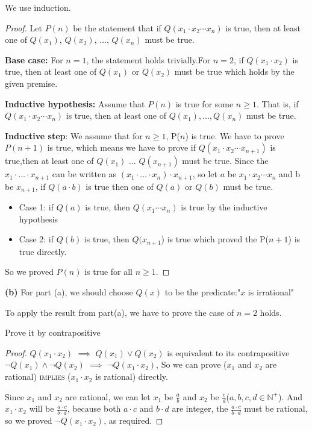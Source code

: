 \documentclass[12pt]{article}
\begin{document}
We use induction.

\begin{proof}
    Let $P(n)$ be the statement that if $Q(x_1 \cdot x_2 \cdots x_n)$ is true, then at least one of $Q(x_1)$, $Q(x_2)$, $\dots$, $Q(x_n)$ must be true.

    \textbf{Base case:} For $n = 1$, the statement holds trivially.For $n = 2$, if $Q(x_1 \cdot x_2)$ is true, then at least one of $Q(x_1)$ or $Q(x_2)$ must be true which holds by the given premise.

    \textbf{Inductive hypothesis:} Assume that $P(n)$ is true for some $n \ge 1$. That is, if $Q(x_1 \cdot x_2 \cdots x_n)$ is true, then at least one of $Q(x_1), \dots, Q(x_n)$ must be true.

    \textbf{Inductive step}: We assume that for $n \ge 1$, P($n$) is true. We have to prove $P(n + 1)$ is true, which means we have to prove if $Q(x_1 \cdot x_2 \cdots x_{n + 1})$ is true,then at least one of $Q(x_1)$ $\ldots$ $Q(x_{n + 1})$ must be true. Since the $x_1 \cdot \ldots \cdot x_{n + 1}$ can be written as $(x_1 \cdot \ldots \cdot x_n) \cdot x_{n + 1}$, so let $a$ be $x_1 \cdot x_2 \cdots x_n$ and b be $x_{n + 1}$, if $Q(a \cdot b)$ is true then one of $Q(a)$ or $Q(b)$ must be true.

    \begin{itemize}
        \item Case 1: if $Q(a)$ is true, then $Q(x_1 \cdots x_n)$ is true by the inductive hypothesis
        \item Case 2: if $Q(b)$ is true, then $Q(x_{n + 1}$) is true which proved the P($n + 1$) is true directly.
    \end{itemize}

    So we proved $P(n)$ is true for all $n \ge 1$.

\end{proof}

\newpage

\noindent \textbf{(b)}
\smallbreak
For part (a), we should choose $Q(x)$ to be the predicate:"$x$ is irrational"

To apply the result from part(a), we have to prove the case of $n = 2$ holds.

Prove it by contrapositive
\begin{proof}
$Q(x_1 \cdot x_2)$ $\implies$ $Q(x_1) \lor Q(x_2)$ is equivalent to its contrapositive $\lnot Q(x_1) \land \lnot Q(x_2)$ $\implies$ $\lnot Q(x_1 \cdot x_2)$, So we can prove ($x_1$ and $x_2$ are rational) \textsc{implies} ($x_1 \cdot x_2$ is rational) directly.

Since $x_1$ and $x_2$ are rational, we can let $x_1$ be $\frac{a}{b}$ and $x_2$ be $\frac{c}{d}$($a, b, c, d \in \mathbb{N^+}$). And $x_1 \cdot x_2$ will be $\frac{a \cdot c}{b \cdot d}$, because both $a \cdot c$ and $b \cdot d$ are integer, the $\frac{a \cdot c}{b \cdot d}$ must be rational, so we proved $\lnot Q(x_1 \cdot x_2)$, as required.
\end{proof}
\end{document}
